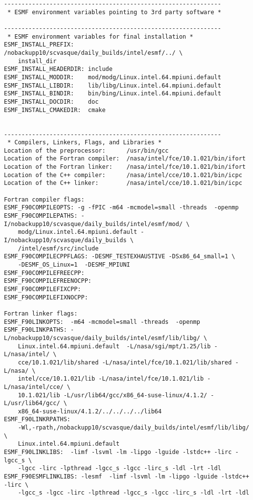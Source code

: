 \begin{verbatim}
--------------------------------------------------------------
 * ESMF environment variables pointing to 3rd party software *
 
--------------------------------------------------------------
 * ESMF environment variables for final installation *
ESMF_INSTALL_PREFIX:    /nobackupp10/scvasque/daily_builds/intel/esmf/../ \
	install_dir
ESMF_INSTALL_HEADERDIR: include
ESMF_INSTALL_MODDIR:    mod/modg/Linux.intel.64.mpiuni.default
ESMF_INSTALL_LIBDIR:    lib/libg/Linux.intel.64.mpiuni.default
ESMF_INSTALL_BINDIR:    bin/bing/Linux.intel.64.mpiuni.default
ESMF_INSTALL_DOCDIR:    doc
ESMF_INSTALL_CMAKEDIR:  cmake
 
 
--------------------------------------------------------------
 * Compilers, Linkers, Flags, and Libraries *
Location of the preprocessor:      /usr/bin/gcc
Location of the Fortran compiler:  /nasa/intel/fce/10.1.021/bin/ifort
Location of the Fortran linker:    /nasa/intel/fce/10.1.021/bin/ifort
Location of the C++ compiler:      /nasa/intel/cce/10.1.021/bin/icpc
Location of the C++ linker:        /nasa/intel/cce/10.1.021/bin/icpc

Fortran compiler flags:
ESMF_F90COMPILEOPTS: -g -fPIC -m64 -mcmodel=small -threads  -openmp
ESMF_F90COMPILEPATHS: -I/nobackupp10/scvasque/daily_builds/intel/esmf/mod/ \
	modg/Linux.intel.64.mpiuni.default -I/nobackupp10/scvasque/daily_builds \
	/intel/esmf/src/include 
ESMF_F90COMPILECPPFLAGS: -DESMF_TESTEXHAUSTIVE -DSx86_64_small=1 \
	-DESMF_OS_Linux=1  -DESMF_MPIUNI
ESMF_F90COMPILEFREECPP: 
ESMF_F90COMPILEFREENOCPP: 
ESMF_F90COMPILEFIXCPP: 
ESMF_F90COMPILEFIXNOCPP: 

Fortran linker flags:
ESMF_F90LINKOPTS:  -m64 -mcmodel=small -threads  -openmp
ESMF_F90LINKPATHS: -L/nobackupp10/scvasque/daily_builds/intel/esmf/lib/libg/ \
	Linux.intel.64.mpiuni.default  -L/nasa/sgi/mpt/1.25/lib -L/nasa/intel/ \
	cce/10.1.021/lib/shared -L/nasa/intel/fce/10.1.021/lib/shared -L/nasa/ \
	intel/cce/10.1.021/lib -L/nasa/intel/fce/10.1.021/lib -L/nasa/intel/cce/ \
	10.1.021/lib -L/usr/lib64/gcc/x86_64-suse-linux/4.1.2/ -L/usr/lib64/gcc/ \
	x86_64-suse-linux/4.1.2/../../../../lib64
ESMF_F90LINKRPATHS: 
	-Wl,-rpath,/nobackupp10/scvasque/daily_builds/intel/esmf/lib/libg/ \
	Linux.intel.64.mpiuni.default
ESMF_F90LINKLIBS:  -limf -lsvml -lm -lipgo -lguide -lstdc++ -lirc -lgcc_s \
	-lgcc -lirc -lpthread -lgcc_s -lgcc -lirc_s -ldl -lrt -ldl
ESMF_F90ESMFLINKLIBS: -lesmf  -limf -lsvml -lm -lipgo -lguide -lstdc++ -lirc \
	-lgcc_s -lgcc -lirc -lpthread -lgcc_s -lgcc -lirc_s -ldl -lrt -ldl


\end{verbatim}
